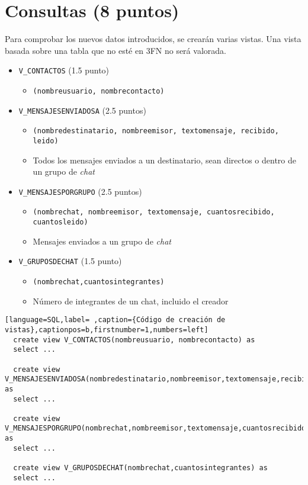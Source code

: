 \documentclass[a4paper]{article}
\begin{document}
\section{Consultas (8 puntos)}
\label{sec:org000000f}

Para comprobar los nuevos datos introducidos, se crearán varias vistas. Una vista basada sobre una tabla que no esté en 3FN no será valorada.

\begin{itemize}
\item \texttt{V\_CONTACTOS} (1.5 punto)
\begin{itemize}
\item \texttt{(nombreusuario, nombrecontacto)}
\end{itemize}
\item \texttt{V\_MENSAJESENVIADOSA} (2.5 puntos)
\begin{itemize}
\item \texttt{(nombredestinatario, nombreemisor, textomensaje, recibido, leido)}
\item Todos los mensajes enviados a un destinatario, sean directos o dentro de un grupo de \emph{chat}
\end{itemize}
\item \texttt{V\_MENSAJESPORGRUPO} (2.5 puntos)
\begin{itemize}
\item \texttt{(nombrechat, nombreemisor, textomensaje, cuantosrecibido, cuantosleido)}
\item Mensajes enviados a un grupo de \emph{chat}
\end{itemize}
\item \texttt{V\_GRUPOSDECHAT} (1.5 punto)
\begin{itemize}
\item \texttt{(nombrechat,cuantosintegrantes)}
\item Número de integrantes de un chat, incluido el creador
\end{itemize}
\end{itemize}

\begin{lstlisting}[language=SQL,label= ,caption={Código de creación de vistas},captionpos=b,firstnumber=1,numbers=left]
  create view V_CONTACTOS(nombreusuario, nombrecontacto) as
  select ...
  
  create view V_MENSAJESENVIADOSA(nombredestinatario,nombreemisor,textomensaje,recibido,leido) as
  select ...
  
  create view V_MENSAJESPORGRUPO(nombrechat,nombreemisor,textomensaje,cuantosrecibido,cuantosleido) as
  select ...
    
  create view V_GRUPOSDECHAT(nombrechat,cuantosintegrantes) as
  select ...
\end{lstlisting}
\end{document}

